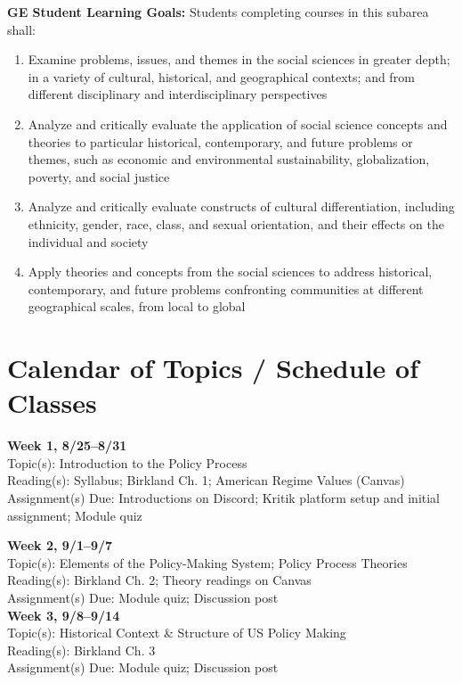 \documentclass[12pt]{article}     %
\begin{document}
\vspace{0.5em}
\noindent \textbf{GE Student Learning Goals:}
Students completing courses in this subarea shall:
\begin{enumerate}
\item Examine problems, issues, and themes in the social sciences in greater depth; in a variety of cultural, historical, and geographical contexts; and from different disciplinary and interdisciplinary perspectives
\item Analyze and critically evaluate the application of social science concepts and theories to particular historical, contemporary, and future problems or themes, such as economic and environmental sustainability, globalization, poverty, and social justice
\item Analyze and critically evaluate constructs of cultural differentiation, including ethnicity, gender, race, class, and sexual orientation, and their effects on the individual and society
\item Apply theories and concepts from the social sciences to address historical, contemporary, and future problems confronting communities at different geographical scales, from local to global
\end{enumerate}

\section{Calendar of Topics / Schedule of Classes}

\noindent \textbf{Week 1, 8/25--8/31}\\
Topic(s): Introduction to the Policy Process\\
Reading(s): Syllabus; Birkland Ch. 1; American Regime Values (Canvas)\\
Assignment(s) Due: Introductions on Discord; Kritik platform setup and initial assignment; Module quiz\

\noindent \textbf{Week 2, 9/1--9/7}\\
Topic(s): Elements of the Policy-Making System; Policy Process Theories\\
Reading(s): Birkland Ch. 2; Theory readings on Canvas\\
Assignment(s) Due: Module quiz; Discussion post\\

\noindent \textbf{Week 3, 9/8--9/14}\\
Topic(s): Historical Context \& Structure of US Policy Making\\
Reading(s): Birkland Ch. 3\\
Assignment(s) Due: Module quiz; Discussion post\\
\end{document}
